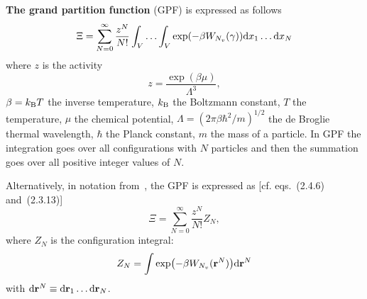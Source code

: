 \documentclass[12pt]{article}
\numberwithin{equation}{section}
\begin{document}
	\textbf{The grand partition function} (GPF) is expressed as follows~\cite[eqs.~(2.4.6) and~(2.3.13)]{HansenMcDonald13}
	\begin{equation*}
		\Xi = \sum_{N=0}^{\infty}\frac{z^N}{N!} \int_{V} \dotsc \int_{V} \exp(-\beta W_{N_v}(\gamma)) {\rm d} x_1 \dotsc {\rm d} x_N
	\end{equation*}
	where $z$ is the activity
	\begin{equation*}
		z = \frac{\exp(\beta \mu)}{\Lambda^3},
	\end{equation*}
	$\beta = k_{\rm B} T$ the inverse temperature, $k_{\rm B}$ the Boltzmann constant, $T$ the temperature, $\mu$ the chemical potential, $\Lambda = (2\pi\beta\hbar^2/m)^{1/2}$ the de Broglie thermal wavelength, $\hbar$ the Planck constant, $m$ the mass of a particle. In GPF the integration goes over all configurations with $N$ particles and then the summation goes over all positive integer values of $N$.
	
	\begin{mdframed}[linecolor=black,linewidth=1pt,leftline=true]
		Alternatively, in notation from~\cite{HansenMcDonald13}, the GPF is expressed as [cf. eqs.~(2.4.6) and~(2.3.13)]
		\begin{equation}\label{ZGR}
			\Xi=\sum_{N=0}^{\infty}\frac{z^N}{N!}Z_N,
		\end{equation}
		where $Z_N$ is the configuration integral:
		\begin{equation}
			Z_N = \int\exp(-\beta W_{N_v}(\vb{r}^N)){\rm d}\vb{r}^N
		\end{equation}
		with ${\rm d} \vb{r}^N \equiv {\rm d}{\vb r_1} \dotsc {\rm d}{\vb r_N}$.
	\end{mdframed}
	
\end{document}
